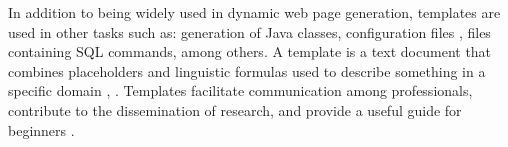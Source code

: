 
In addition to being widely used in dynamic web page generation, templates are used in other tasks such as: generation of Java \cite{arnoldus2007} classes, configuration files \cite{costa2015}, files containing SQL commands, among others. A template is a text document that combines placeholders and linguistic formulas used to describe something in a specific domain \cite{arnoldus2007}, \cite{segura2017}. Templates facilitate communication among professionals, contribute to the dissemination of research, and provide a useful guide for beginners \cite{segura2017}.



